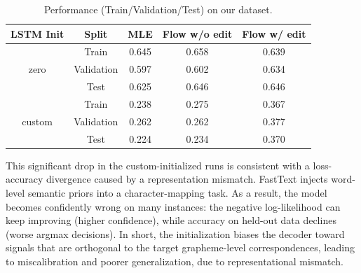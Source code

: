 \begin{table}[h!]
\centering
\begin{tabular}{|c|c|c|c|c|}
\hline
\textbf{LSTM Init} & \textbf{Split} & \textbf{MLE} & \textbf{Flow w/o edit} & \textbf{Flow w/ edit} \\
\hline
\multirow{3}{*}{zero}
& Train      & 0.645 & 0.658 & 0.639 \\
& Validation & 0.597 & 0.602 & 0.634 \\
& Test       & 0.625 & 0.646 & 0.646 \\
\hline
\multirow{3}{*}{custom}
& Train      & 0.238 & 0.275 & 0.367 \\
& Validation & 0.262 & 0.262 & 0.377 \\
& Test       & 0.224 & 0.234 & 0.370 \\
\hline
\end{tabular}
\caption{Performance (Train/Validation/Test) on our dataset.}
\end{table}

This significant drop in the custom-initialized runs is consistent with a loss-accuracy divergence caused by a representation mismatch.
FastText injects word-level semantic priors into a character-mapping task.
As a result, the model becomes confidently wrong on many instances: the negative log-likelihood can keep improving (higher confidence), while accuracy on held-out data declines (worse argmax decisions).
In short, the initialization biases the decoder toward signals that are orthogonal to the target grapheme-level correspondences, leading to miscalibration and poorer generalization, due to representational mismatch.

